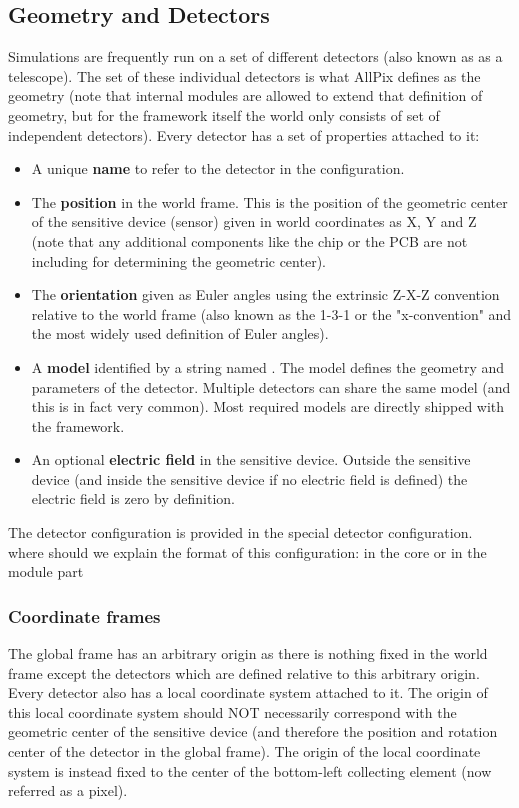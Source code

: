 \subsection{Geometry and Detectors}
\label{sec:models_geometry}
Simulations are frequently run on a set of different detectors (also known as as a telescope). The set of these individual detectors is what AllPix defines as the geometry (note that internal modules are allowed to extend that definition of geometry, but for the framework itself the world only consists of set of independent detectors). Every detector has a set of properties attached to it:
\begin{itemize}
\item A unique \textbf{name} to refer to the detector in the configuration.
\item The \textbf{position} in the world frame. This is the position of the geometric center of the sensitive device (sensor) given in world coordinates as X, Y and Z (note that any additional components like the chip or the PCB are not including for determining the geometric center).
\item The \textbf{orientation} given as Euler angles using the extrinsic Z-X-Z convention relative to the world frame (also known as the 1-3-1 or the "x-convention" and the most widely used definition of Euler angles\cite{eulerangles}). 
\item A \textbf{model} identified by a string named . The model defines the geometry and parameters of the detector. Multiple detectors can share the same model (and this is in fact very common). Most required models are directly shipped with the framework.
\item An optional \textbf{electric field} in the sensitive device. Outside the sensitive device (and inside the sensitive device if no electric field is defined) the electric field is zero by definition.
\end{itemize}

The detector configuration is provided in the special detector configuration. \todo where should we explain the format of this configuration: in the core or in the module part \todo

\subsubsection{Coordinate frames}
The global frame has an arbitrary origin as there is nothing fixed in the world frame except the detectors which are defined relative to this arbitrary origin. Every detector also has a local coordinate system attached to it. The origin of this local coordinate system should NOT necessarily correspond with the geometric center of the sensitive device (and therefore the position and rotation center of the detector in the global frame). The origin of the local coordinate system is instead fixed to the center of the bottom-left collecting element (now referred as a pixel). 

